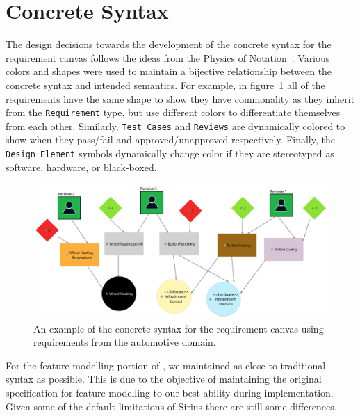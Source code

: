 \section{Concrete Syntax}

The design decisions towards the development of the concrete syntax for the requirement canvas follows the ideas from the Physics of Notation~\cite{5353439}. Various colors and shapes were used to maintain a bijective relationship between the concrete syntax and intended semantics. For example, in figure~\ref{fig:concrete_syntax_req_diag} all of the requirements have the same shape to show they have commonality as they inherit from the \texttt{Requirement} type, but use different colors to differentiate themselves from each other. Similarly, \texttt{Test Cases} and \texttt{Reviews} are dynamically colored to show when they pass/fail and approved/unapproved respectively. Finally, the \texttt{Design Element} symbols dynamically change color if they are stereotyped as software, hardware, or black-boxed.

\begin{figure}[hbt!]
	\centering
	\includegraphics[scale=0.043]{Figures/Requirement Diagram_SteeringWheel.jpg}
	\caption{An example of the concrete syntax for the requirement canvas using requirements from the automotive domain.}
	\label{fig:concrete_syntax_req_diag}
\end{figure}

For the feature modelling portion of \tool, we maintained as close to traditional syntax as possible. This is due to the objective of maintaining the original specification for feature modelling to our best ability during implementation. Given some of the default limitations of Sirius there are still some differences. 

